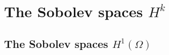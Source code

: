 
\section{The Sobolev spaces $H^k$}
\label{sec:lp}

\subsection{The Sobolev spaces $H^1(\Omega)$}



